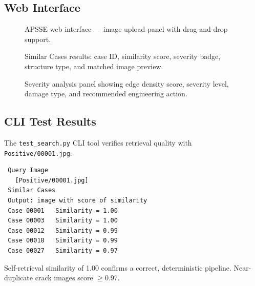 \documentclass[conference]{IEEEtran}
\begin{document}
\subsection{Web Interface}

\begin{figure}[H]
  \centering
  \caption{APSSE web interface --- image upload panel with drag-and-drop support.}
  \label{fig:ui_upload}
\end{figure}

\begin{figure}[H]
  \centering
  \caption{Similar Cases results: case ID, similarity score, severity badge, structure type, and matched image preview.}
  \label{fig:ui_results}
\end{figure}

\begin{figure}[H]
  \centering
  \caption{Severity analysis panel showing edge density score, severity level, damage type, and recommended engineering action.}
  \label{fig:severity}
\end{figure}

\subsection{CLI Test Results}

The \texttt{test\_search.py} CLI tool verifies retrieval quality with \texttt{Positive/00001.jpg}:

\begin{verbatim}
 Query Image
   [Positive/00001.jpg]
 Similar Cases
 Output: image with score of similarity
 Case 00001   Similarity = 1.00
 Case 00003   Similarity = 1.00
 Case 00012   Similarity = 0.99
 Case 00018   Similarity = 0.99
 Case 00027   Similarity = 0.97
\end{verbatim}

Self-retrieval similarity of 1.00 confirms a correct, deterministic pipeline. Near-duplicate crack images score $\geq$0.97.
\end{document}

